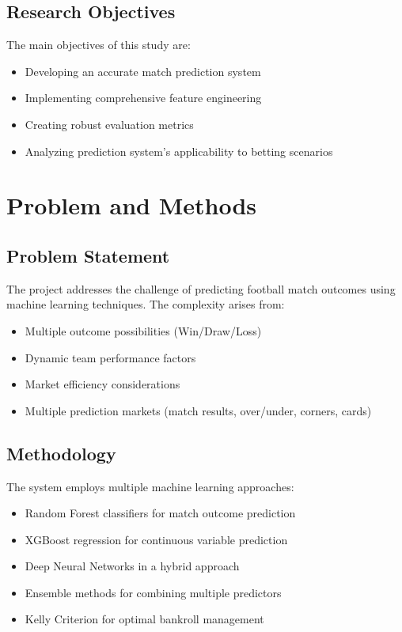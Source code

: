 \documentclass[conference]{IEEEtran}
\begin{document}
\subsection{Research Objectives}
The main objectives of this study are:
\begin{itemize}
    \item Developing an accurate match prediction system
    \item Implementing comprehensive feature engineering
    \item Creating robust evaluation metrics
    \item Analyzing prediction system's applicability to betting scenarios
\end{itemize}

\section{Problem and Methods}

\subsection{Problem Statement}
The project addresses the challenge of predicting football match outcomes using machine learning techniques. The complexity arises from:
\begin{itemize}
    \item Multiple outcome possibilities (Win/Draw/Loss)
    \item Dynamic team performance factors
    \item Market efficiency considerations
    \item Multiple prediction markets (match results, over/under, corners, cards)
\end{itemize}

\subsection{Methodology}
The system employs multiple machine learning approaches:
\begin{itemize}
    \item Random Forest classifiers for match outcome prediction
    \item XGBoost regression for continuous variable prediction
    \item Deep Neural Networks in a hybrid approach
    \item Ensemble methods for combining multiple predictors
    \item Kelly Criterion for optimal bankroll management
\end{itemize}
\end{document}
